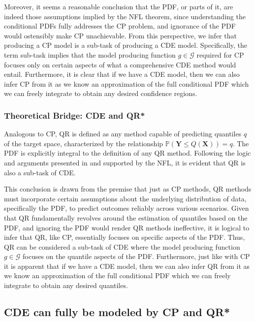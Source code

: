 Moreover, it seems a reasonable conclusion that the PDF, or parts of it, are indeed those assumptions implied by the NFL theorem, since understanding the conditional PDFs fully addresses the CP problem, and ignorance of the PDF would ostensibly make CP unachievable. From this perspective, we infer that producing a CP model is a sub-task of producing a CDE model. Specifically, the term sub-task implies that the model producing function $g \in \mathcal{G}$ required for CP focuses only on certain aspects of what a comprehensive CDE method would entail. Furthermore, it is clear that if we have a CDE model, then we can also infer CP from it as we know an approximation of the full conditional PDF which we can freely integrate to obtain any desired confidence regions.

\subsubsection{Theoretical Bridge: CDE and QR*}\label{sec:bridge_cde_qr}

Analogous to CP, QR is defined as any method capable of predicting quantiles \( q \) of the target space, characterized by the relationship \( \mathbb{P}(\mathbf{Y} \leq Q(\mathbf{X})) = q \). The PDF is explicitly integral to the definition of any QR method. Following the logic and arguments presented in  and supported by the NFL, it is evident that QR is also a sub-task of CDE.

This conclusion is drawn from the premise that just as CP methods, QR methods must incorporate certain assumptions about the underlying distribution of data, specifically the PDF, to predict outcomes reliably across various scenarios. Given that QR fundamentally revolves around the estimation of quantiles based on the PDF, and ignoring the PDF would render QR methods ineffective, it is logical to infer that QR, like CP, essentially focuses on specific aspects of the PDF. Thus, QR can be considered a sub-task of CDE where the model producing function \( g \in \mathcal{G} \) focuses on the quantile aspects of the PDF. Furthermore, just like with CP it is apparent that if we have a CDE model, then we can also infer QR from it as we know an approximation of the full conditional PDF which we can freely integrate to obtain any desired quantiles.


\subsection{CDE can fully be modeled by CP and QR*} \label{sec:cde_sub_cp_qr}

